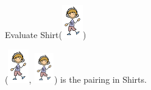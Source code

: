 \documentclass{ximera}
\begin{document}
\begin{exercise}
Evaluate Shirt({\includegraphics[width=34px,height=55px]{pics/elements/family/family4.png}})
  \begin{multipleChoice}
  \end{multipleChoice}
  \begin{feedback}
({\includegraphics[width=34px,height=55px]{pics/elements/family/family4.png}}, {\includegraphics[width=33px,height=49px]{pics/elements/family/family4.png}}) is the pairing in Shirts.
  \end{feedback}
\end{exercise}
\end{document}
